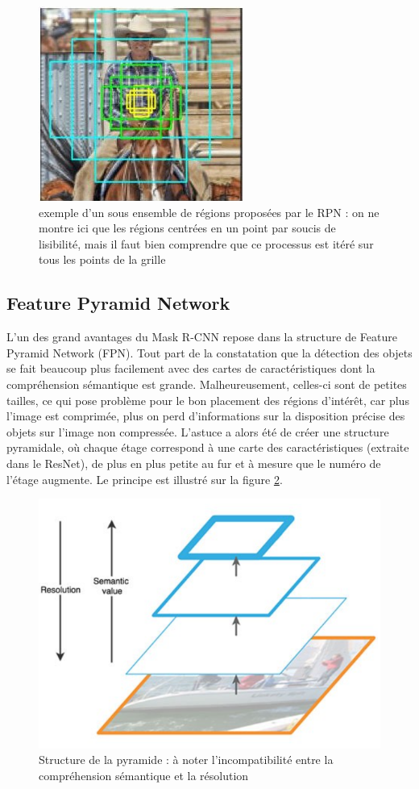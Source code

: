 \begin{figure}[!h]
\centering
\includegraphics[width=150pts]{images/Mask_R_CNN/proposed_anchors.png} 
\caption{exemple d'un sous ensemble de régions proposées par le RPN : on ne montre ici que les régions centrées en un point par soucis de lisibilité, mais il faut bien comprendre que ce processus est itéré sur tous les points de la grille}
\label{proposed_anchors}
\end{figure}

\subsection{Feature Pyramid Network}

L'un des grand avantages du Mask R-CNN repose dans la structure de Feature Pyramid Network (FPN). Tout part de la constatation que la détection des objets se fait beaucoup plus facilement avec des cartes de caractéristiques dont la compréhension sémantique est grande. Malheureusement, celles-ci sont de petites tailles, ce qui pose problème pour le bon placement des régions d'intérêt, car plus l'image est comprimée, plus on perd d'informations sur la disposition précise des objets sur l'image non compressée. L'astuce a alors été de créer une structure pyramidale, où chaque étage correspond à une carte des caractéristiques (extraite dans le ResNet), de plus en plus petite au fur et à mesure que le numéro de l'étage augmente. Le principe est illustré sur la figure \ref{FPN_1}.

\begin{figure}[!h]
\centering
\includegraphics[width=200pts]{images/Mask_R_CNN/FPN_1.png} 
\caption{Structure de la pyramide : à noter l'incompatibilité entre la compréhension sémantique et la résolution}
\label{FPN_1}
\end{figure}

